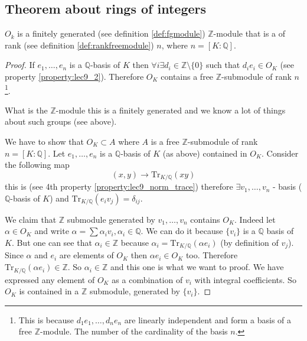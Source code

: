 \subsection{Theorem about rings of integers}
\begin{theorem}
  $O_k$ is a finitely generated (see definition \ref{def:fgmodule})
  $\mathbb{Z}$-module that is a  of
  rank (see definition \ref{def:rankfreemodule}) $n$, where $n=
  \left[K:\mathbb{Q}\right]$. 
  \begin{proof}
    If $e_1, \dots, e_n$ is a $\mathbb{Q}$-basis of $K$ then
    $\forall i \exists d_i \in \mathbb{Z} \setminus
    \{0\}$ such that $d_i e_i \in O_K$ (see property
    \ref{property:lec9_2}). Therefore $O_K$ contains a free
    $\mathbb{Z}$-submodule of rank $n$
    \footnote{
      This is because $d_1 e_1, \dots, d_n e_n$ are linearly
      independent and form a basis of a free $\mathbb{Z}$-module. The
      number of the cardinality of the basis $n$.
    }.

    What is the $\mathbb{Z}$-module this is a finitely generated
     and we know a lot of things about such
    groups (see above).

    We have to show that $O_K \subset A$ where $A$ is a free
    $\mathbb{Z}$-submodule of rank $n = \left[K:\mathbb{Q}\right]$.
    Let $e_1, \dots, e_n$ is a $\mathbb{Q}$-basis of $K$ (as above)
    contained in $O_K$. Consider the following map
    \[
    (x,y) \to \mathrm{Tr}_{K/\mathbb{Q}}\left(xy\right) 
    \]
    this is
     (see 4th property
    \ref{property:lec9_norm_trace}) therefore $\exists v_1, \dots,
    v_n$ -  basis ($\mathbb{Q}$-basis of $K$) and
    $\mathrm{Tr}_{K/\mathbb{Q}}\left(e_i v_j\right) = \delta_{ij}$.

    We claim that $\mathbb{Z}$ submodule generated by $v_1, \dots,
    v_n$ contains $O_K$. Indeed let $\alpha \in O_K$ and write
    \(
    \alpha = \sum \alpha_i v_i, \alpha_i \in \mathbb{Q}
    \). We can do it because $\{v_i\}$ is a $\mathbb{Q}$ basis of
    $K$. But one can see that $\alpha_i \in \mathbb{Z}$ because
    $\alpha_i = \mathrm{Tr}_{K/\mathbb{Q}}\left(\alpha e_i\right)$ (by
    definition of $v_j$). Since $\alpha$ and $e_i$ are elements of
    $O_K$ then $\alpha e_i \in O_K$ too. Therefore
    $\mathrm{Tr}_{K/\mathbb{Q}}\left(\alpha e_i\right) \in
    \mathbb{Z}$. So $\alpha_i \in \mathbb{Z}$ and this one is what we
    want to proof. We have expressed any element of $O_K$ as a
    combination of $v_i$ with integral coefficients. So $O_K$ is contained
    in a $\mathbb{Z}$ submodule, generated by $\{v_i\}$.  
  \end{proof}
  \label{thm:lec9_1}
\end{theorem}

